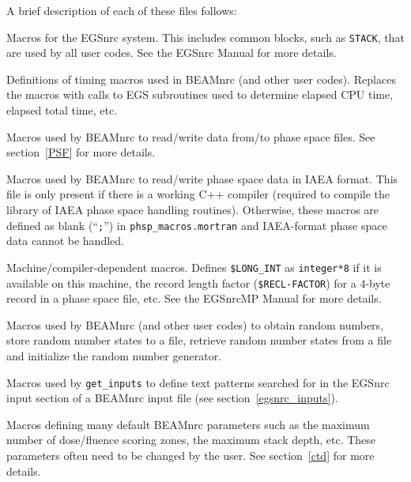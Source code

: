 \documentclass[12pt,twoside]{article}
\begin{document}
A brief description of each of these files follows:
\begin{description}
\item [{\tt egsnrc.macros}]  Macros for the EGSnrc system.  This
includes common blocks, such as {\tt STACK}, that are used by
all user codes.  See the EGSnrc Manual\cite{KR03} for more details.
\item [{\tt timing.macros}] Definitions of timing macros used in
BEAMnrc (and other user codes).  Replaces the macros with calls to
EGS subroutines used to determine elapsed CPU time, elapsed total
time, etc.
\item[{\tt phsp\_macros.mortran}] Macros used by BEAMnrc to
read/write data from/to phase space files.  See section~\ref{PSF} for
more details.
\item[{\tt iaea\_phsp\_macros.mortran}] Macros used by BEAMnrc to
read/write phase space data in IAEA format.  This file is only present
if there is a working C++ compiler (required to compile the library of
IAEA phase space handling routines).  Otherwise, these macros are defined
as blank (``{\tt ;}'') in {\tt phsp\_macros.mortran} and IAEA-format phase
space data cannot be handled.
\item [{\tt machine.macros}] Machine/compiler-dependent macros.
Defines {\tt \$LONG\_INT} as {\tt integer*8} if it is available
on this machine, the record length factor ({\tt \$RECL-FACTOR}) for
a 4-byte record in a phase space file, etc.  See the EGSnrcMP Manual\cite{Ka03}
for more details.
\item [{\tt ranmar.macros} (or {\tt ranlux.macros})] Macros used by
BEAMnrc (and other user codes) to obtain random numbers, store random
number states to a file, retrieve random number states from a file and
initialize the random number generator.
\item [{\tt transportp.macros}] Macros used by {\tt get\_inputs} to
define text patterns searched for in the EGSnrc input section of
a BEAMnrc input file (see section~\ref{egsnrc_inputs}).
\item[{\tt beamnrc\_user\_macros.mortran}] Macros defining many
default BEAMnrc parameters such as the maximum number of dose/fluence
scoring zones, the maximum stack depth, etc.  These parameters often need to be
changed by the user.  See section~\ref{ctd} for more details.

\end{description}
\end{document}
